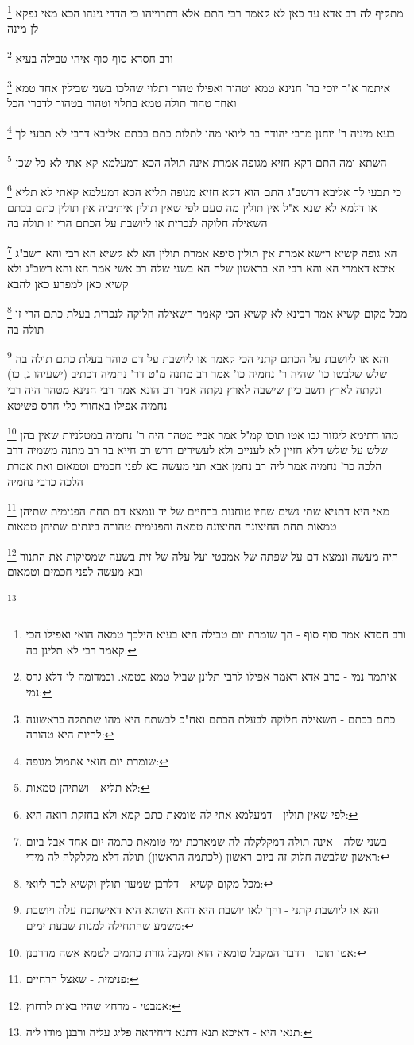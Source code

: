 \documentclass[12pt, openany]{book}
\newcommand{\footnotecomment}[1]{
	\renewcommand\thefootnote{}
	\footnote{#1}}
\newcommand{\commenta}[1]{\footnotecomment{#1}}
\begin{document}
{{\commenta{ורב חסדא אמר סוף סוף - הך שומרת יום טבילה היא בעיא הילכך טמאה הואי ואפילו הכי קאמר רבי לא תלינן בה:}
מתקיף לה רב אדא עד כאן לא קאמר רבי התם אלא דתרוייהו כי הדדי נינהו הכא מאי נפקא לן מינה 
\commenta{איתמר נמי - כרב אדא דאמר אפילו לרבי תלינן שביל טמא בטמא. וכמדומה לי דלא גרס נמי:}
ורב חסדא סוף סוף איהי טבילה בעיא 
\commenta{כתם בכתם - השאילה חלוקה לבעלת הכתם ואח"כ לבשתה היא מהו שתתלה בראשונה להיות היא טהורה:}
איתמר א"ר יוסי בר' חנינא טמא וטהור ואפילו טהור ותלוי שהלכו בשני שבילין אחד טמא ואחד טהור תולה טמא בתלוי וטהור בטהור לדברי הכל 
\commenta{שומרת יום חזאי אתמול מגופה:}
בעא מיניה ר' יוחנן מרבי יהודה בר ליואי מהו לתלות כתם בכתם אליבא דרבי לא תבעי לך
\commenta{לא תליא - ושתיהן טמאות:}
השתא ומה התם דקא חזיא מגופה אמרת אינה תולה הכא דמעלמא קא אתי לא כל שכן 
\commenta{לפי שאין תולין - דמעלמא אתי לה טומאת כתם קמא ולא בחזקת רואה היא:}
כי תבעי לך אליבא דרשב"ג התם הוא דקא חזיא מגופה תליא הכא דמעלמא קאתי לא תליא או דלמא לא שנא 
א"ל אין תולין מה טעם לפי שאין תולין 
איתיביה אין תולין כתם בכתם השאילה חלוקה לנכרית או ליושבת על הכתם הרי זו תולה בה 
\commenta{בשני שלה - אינה תולה דמקלקלה לה שמארכת ימי טומאת כתמה יום אחד אבל ביום ראשון שלבשה חלוק זה ביום ראשון (לכתמה הראשון) תולה דלא מקלקלה לה מידי:}
הא גופה קשיא רישא אמרת אין תולין סיפא אמרת תולין הא לא קשיא הא רבי והא רשב"ג 
איכא דאמרי הא והא רבי הא בראשון שלה הא בשני שלה 
רב אשי אמר הא והא רשב"ג ולא קשיא
כאן למפרע כאן להבא 
\commenta{מכל מקום קשיא - דלרבן שמעון תולין וקשיא לבר ליואי:}
מכל מקום קשיא אמר רבינא לא קשיא הכי קאמר השאילה חלוקה לנכרית בעלת כתם הרי זו תולה בה
\commenta{והא או ליושבת קתני - והך לאו יושבת היא דהא השתא היא דאישתכח עלה ויושבת משמע שהתחילה למנות שבעת ימים:}
והא או ליושבת על הכתם קתני הכי קאמר או ליושבת על דם טוהר בעלת כתם תולה בה
שלש שלבשו כו' שהיה ר' נחמיה כו' אמר רב מתנה מ"ט דר' נחמיה דכתיב (ישעיהו ג, כו) ונקתה לארץ תשב כיון שישבה לארץ נקתה 
אמר רב הונא אמר רבי חנינא מטהר היה רבי נחמיה אפילו באחורי כלי חרס פשיטא 
\commenta{אטו תוכו - דדבר המקבל טומאה הוא ומקבל גזרת כתמים לטמא אשה מדרבנן:}
מהו דתימא ליגזור גבו אטו תוכו קמ"ל 
אמר אביי מטהר היה ר' נחמיה במטלניות שאין בהן שלש על שלש דלא חזיין לא לעניים ולא לעשירים 
דרש רב חייא בר רב מתנה משמיה דרב הלכה כר' נחמיה אמר ליה רב נחמן אבא תני מעשה בא לפני חכמים וטמאום ואת אמרת הלכה כרבי נחמיה 
\commenta{פנימית - שאצל הרחיים:}
מאי היא דתניא שתי נשים שהיו טוחנות ברחיים של יד ונמצא דם תחת הפנימית שתיהן טמאות תחת החיצונה החיצונה טמאה והפנימית טהורה בינתים שתיהן טמאות 
\commenta{אמבטי - מרחץ שהיו באות לרחוץ:}
היה מעשה ונמצא דם על שפתה של אמבטי ועל עלה של זית בשעה שמסיקות את התנור ובא מעשה לפני חכמים וטמאום 
\commenta{תנאי היא - דאיכא תנא דתנא דיחידאה פליג עליה ורבנן מודו ליה:}
}}
\end{document}
